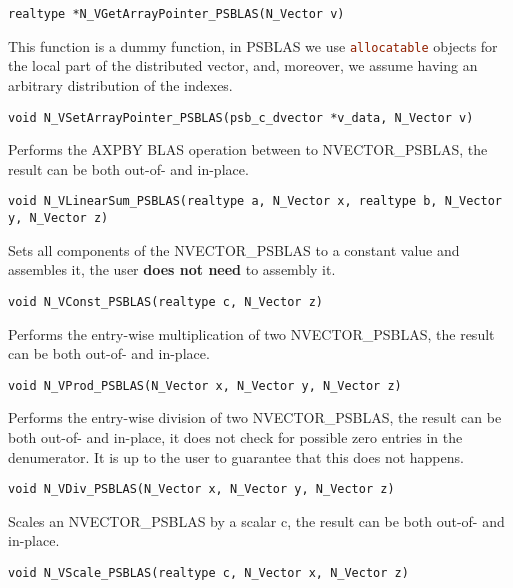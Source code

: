 \documentclass[twoside,a4paper]{refart}
\begin{document}
\begin{description}
 	 \lstinline[style=CStyle]|realtype *N_VGetArrayPointer_PSBLAS(N_Vector v)|
 	
 	\item[\fbox{\texttt{N\_VSetArrayPointer\_PSBLAS}}] This function is a dummy function, in PSBLAS we use \lstinline[language=Fortran]|allocatable| objects for the local part of the distributed vector, and, moreover, we assume having an arbitrary distribution of the indexes.
 	
 	 \lstinline[style=CStyle]|void N_VSetArrayPointer_PSBLAS(psb_c_dvector *v_data, N_Vector v)|
 	
 	\item[\fbox{\texttt{N\_VLinearSum\_PSBLAS}}] Performs the AXPBY BLAS operation between to  NVECTOR\_PSBLAS, the result can be both out-of- and in-place.
 	
 	 \lstinline[style=CStyle]|void N_VLinearSum_PSBLAS(realtype a, N_Vector x, realtype b, N_Vector y, N_Vector z)|
 	
 	\item[\fbox{\texttt{N\_VConst\_PSBLAS}}] Sets all components of the NVECTOR\_PSBLAS to a constant value and assembles it, the user \textbf{does not need} to assembly it.
 	
 	 \lstinline[style=CStyle]|void N_VConst_PSBLAS(realtype c, N_Vector z)|
 	
 	\item[\fbox{\texttt{N\_VProd\_PSBLAS}}] Performs the entry-wise multiplication of two NVECTOR\_PSBLAS, the result can be both out-of- and in-place.
 	
 	 \lstinline[style=CStyle]|void N_VProd_PSBLAS(N_Vector x, N_Vector y, N_Vector z)|
 	
 	\item[\fbox{\texttt{N\_VDiv\_PSBLAS}}] Performs the entry-wise division of two NVECTOR\_PSBLAS, the result can be both out-of- and in-place, it does not check for possible zero entries in the denumerator. It is up to the user to guarantee that this does not happens.
 	
 	 \lstinline[style=CStyle]|void N_VDiv_PSBLAS(N_Vector x, N_Vector y, N_Vector z)|
 	
 	\item[\fbox{\texttt{N\_VScale\_PSBLAS}}] Scales an NVECTOR\_PSBLAS by a scalar c, the result can be both out-of- and in-place.
 	 
 	 \lstinline[style=CStyle]|void N_VScale_PSBLAS(realtype c, N_Vector x, N_Vector z)|
 	

\end{description}
\end{document}
